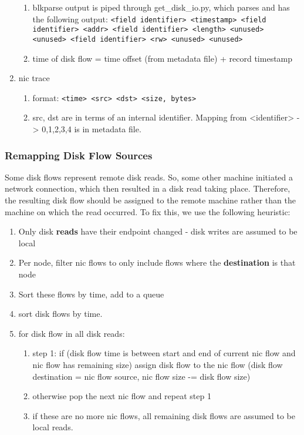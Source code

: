 \begin{enumerate}
\begin{enumerate}
    \item blkparse output is piped through get\_disk\_io.py, which parses and has the following output: \texttt{<field identifier> <timestamp> <field identifier> <addr> <field identifier> <length> <unused> <unused> <field identifier> <rw> <unused> <unused>}
    \item time of disk flow = time offset (from metadata file) + record timestamp
    \end{enumerate}
\item nic trace
    \begin{enumerate}
    \item format: \texttt{<time> <src> <dst> <size, bytes>}
    \item src, dst are in terms of an internal identifier. Mapping from <identifier> -> {0,1,2,3,4} is in metadata file.
    \end{enumerate}
\end{enumerate}

\subsubsection{Remapping Disk Flow Sources}
Some disk flows represent remote disk reads. So, some other machine initiated a network connection, which then resulted in a disk read taking place. Therefore, the resulting disk flow should be assigned to the remote machine rather than the machine on which the read occurred.
To fix this, we use the following heuristic:
\begin{enumerate}
\item Only disk \textbf{reads} have their endpoint changed - disk writes are assumed to be local
\item Per node, filter nic flows to only include flows where the \textbf{destination} is that node
\item Sort these flows by time, add to a queue
\item sort disk flows by time.
\item for disk flow in all disk reads:
    \begin{enumerate}
    \item step 1: if (disk flow time is between start and end of current nic flow and nic flow has remaining size) assign disk flow to the nic flow (disk flow destination = nic flow source, nic flow size -= disk flow size)
    \item otherwise pop the next nic flow and repeat step 1
    \item if these are no more nic flows, all remaining disk flows are assumed to be local reads.
    \end{enumerate}
\end{enumerate}

